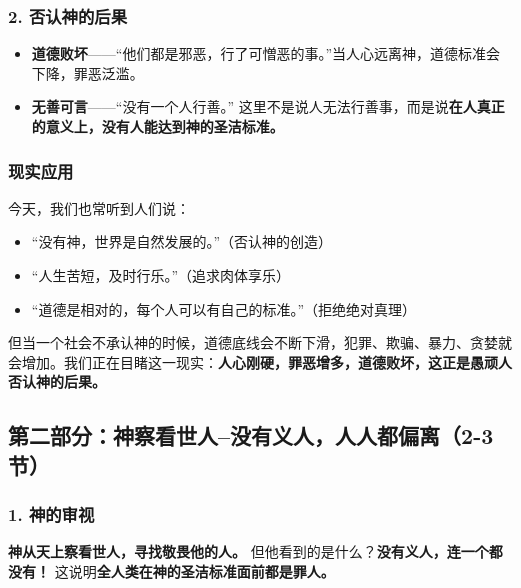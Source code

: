 \documentclass[a4paper, 12pt]{article}
\begin{document}
\subsubsection*{2. 否认神的后果}

\begin{itemize}
    \item \textbf{道德败坏}——“他们都是邪恶，行了可憎恶的事。”当人心远离神，道德标准会下降，罪恶泛滥。  
    \item \textbf{无善可言}——“没有一个人行善。” 这里不是说人无法行善事，而是说\textbf{在人真正的意义上，没有人能达到神的圣洁标准。} 
\end{itemize}


\subsubsection*{现实应用} 

\hspace{0.7cm}今天，我们也常听到人们说： 

\begin{itemize}
    \item “没有神，世界是自然发展的。”（否认神的创造）  
    \item “人生苦短，及时行乐。”（追求肉体享乐）  
    \item “道德是相对的，每个人可以有自己的标准。”（拒绝绝对真理）  
\end{itemize}

但当一个社会不承认神的时候，道德底线会不断下滑，犯罪、欺骗、暴力、贪婪就会增加。我们正在目睹这一现实：\textbf{人心刚硬，罪恶增多，道德败坏，这正是愚顽人否认神的后果。}  


\subsection*{第二部分：神察看世人--没有义人，人人都偏离（2-3节）}



\subsubsection*{1. 神的审视}
\textbf{神从天上察看世人，寻找敬畏他的人。} 但他看到的是什么？\textbf{没有义人，连一个都没有！} 这说明\textbf{全人类在神的圣洁标准面前都是罪人。}  
\end{document}
